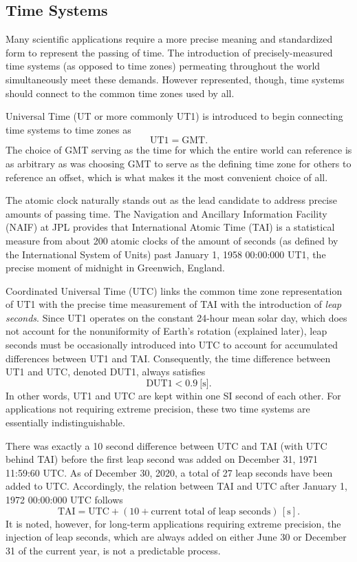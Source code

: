 \documentclass[11pt,dvipsnames]{thesis}
\begin{document}
\subsection{Time Systems}
Many scientific applications require a more precise meaning and standardized form to represent the passing of time. The introduction of precisely-measured time systems (as opposed to time zones) permeating throughout the world simultaneously meet these demands. However represented, though, time systems should connect to the common time zones used by all.

Universal Time (UT or more commonly UT1) is introduced to begin connecting time systems to time zones as
\begin{equation}
\mathrm{UT1} = \mathrm{GMT}.
\end{equation}
The choice of GMT serving as the time for which the entire world can reference is as arbitrary as was choosing GMT to serve as the defining time zone for others to reference an offset, which is what makes it the most convenient choice of all. 

The atomic clock naturally stands out as the lead candidate to address precise amounts of passing time. The Navigation and Ancillary Information Facility (NAIF) at JPL provides that International Atomic Time (TAI) is a statistical measure from about 200 atomic clocks of the amount of seconds (as defined by the International System of Units) past January 1, 1958 00:00:000 UT1, the precise moment of midnight in Greenwich, England.

Coordinated Universal Time (UTC) links the common time zone representation of UT1 with the precise time measurement of TAI with the introduction of \textit{leap seconds}. Since UT1 operates on the constant 24-hour mean solar day, which does not account for the nonuniformity of Earth's rotation (explained later), leap seconds must be occasionally introduced into UTC to account for accumulated differences between UT1 and TAI. Consequently, the time difference between UT1 and UTC, denoted DUT1, always satisfies
\begin{equation}
\mathrm{DUT1} < \SI{0.9}{[\s]}.
\end{equation}
In other words, UT1 and UTC are kept within one SI second of each other. For applications not requiring extreme precision, these two time systems are essentially indistinguishable.

There was exactly a 10 second difference between UTC and TAI (with UTC behind TAI) before the first leap second was added on December 31, 1971 11:59:60 UTC. As of December 30, 2020, a total of 27 leap seconds have been added to UTC. Accordingly, the relation between TAI and UTC after January 1, 1972 00:00:000 UTC follows
\begin{equation}
\mathrm{TAI} = \mathrm{UTC} + (10 + \text{current total of leap seconds}) \,[\si{\s}].
\end{equation}
It is noted, however, for long-term applications requiring extreme precision, the injection of leap seconds, which are always added on either June 30 or December 31 of the current year, is not a predictable process. 
\end{document}
